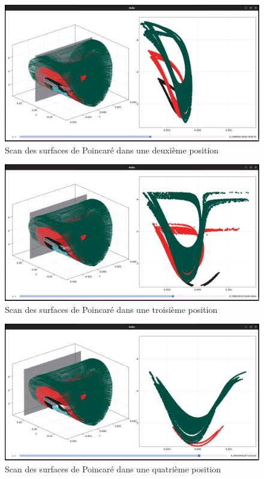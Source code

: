 \documentclass[a4paper, french, 12pt, titlepage]{article}
\begin{document}
\begin{figure}[H]
  \begin{center}
    \includegraphics[width=\linewidth]{poincarescan_1.png}
    \caption{Scan des surfaces de Poincaré dans une deuxième position}
    \label{fig:fig12}
  \end{center}
\end{figure}

\begin{figure}[H]
  \includegraphics[width=\linewidth]{poincarescan_2.png}
  \caption{Scan des surfaces de Poincaré dans une troisième position}
  \label{fig:fig13}
\end{figure}

\begin{figure}[H]
  \includegraphics[width=\linewidth]{poincarescan_3.png}
  \caption{Scan des surfaces de Poincaré dans une quatrième position}
  \label{fig:fig14}
\end{figure}
\end{document}
